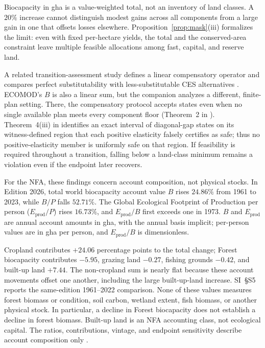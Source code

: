\documentclass[preprint,12pt,authoryear]{elsarticle}
\begin{document}
Biocapacity in gha is a value-weighted total, not an inventory of land classes. A $20\%$ increase cannot distinguish modest gains across all components from a large gain in one that offsets losses elsewhere. Proposition~\ref{prop:mask}(iii) formalizes the limit: even with fixed per-hectare yields, the total and the conserved-area constraint leave multiple feasible allocations among fast, capital, and reserve land.

A related transition-assessment study defines a linear compensatory operator and compares perfect substitutability with less-substitutable CES alternatives \citep[Sections~2 and 4 of][]{Abaee2026b}. ECOMOD's $B$ is also a linear sum, but the companion analyzes a different, finite-plan setting. There, the compensatory protocol accepts states even when no single available plan meets every component floor (Theorem~2 in \citet{Abaee2026b}). Theorem~4(iii) in \citet{Abaee2026b} identifies an exact interval of diagonal-gap states on its witness-defined region that each positive elasticity falsely certifies as safe; thus no positive-elasticity member is uniformly safe on that region. If feasibility is required throughout a transition, falling below a land-class minimum remains a violation even if the endpoint later recovers.

For the NFA, these findings concern account composition, not physical stocks. In Edition 2026, total world biocapacity account value $B$ rises $24.86\%$ from 1961 to 2023, while $B/P$ falls $52.71\%$. The Global Ecological Footprint of Production per person ($E_{\mathrm{prod}}/P$) rises $16.73\%$, and $E_{\mathrm{prod}}/B$ first exceeds one in 1973. $B$ and $E_{\mathrm{prod}}$ are annual account amounts in gha, with the annual basis implicit; per-person values are in gha per person, and $E_{\mathrm{prod}}/B$ is dimensionless.

Cropland contributes $+24.06$ percentage points to the total change; Forest biocapacity contributes $-5.95$, grazing land $-0.27$, fishing grounds $-0.42$, and built-up land $+7.44$. The non-cropland sum is nearly flat because these account movements offset one another, including the large built-up-land increase. SI~\S S5 reports the same-edition 1961--2022 comparison. None of these values measures forest biomass or condition, soil carbon, wetland extent, fish biomass, or another physical stock. In particular, a decline in Forest biocapacity does not establish a decline in forest biomass. Built-up land is an NFA accounting class, not ecological capital. The ratios, contributions, vintage, and endpoint sensitivity describe account composition only \citep{Lo2026NFA,Borucke2013,Blomqvist2013,GiampietroSaltelli2014,Galli2016,vdBerghGrazi2015}.
\end{document}
